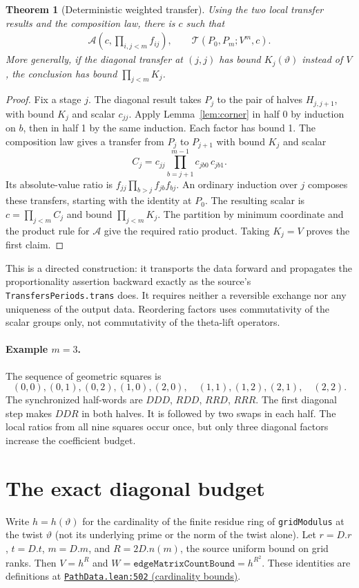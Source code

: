 \documentclass[11pt]{article}
\newtheorem{theorem}{Theorem}[section]
\newcommand{\code}[1]{\texttt{#1}}
\newcommand{\base}{https://github.com/VladimirReshetnikov/ProveIt/blob/835c3695d07c0f77060c5cc63f92eeb52a7d21c2/Analysis/GeneralizedRiemannHypothesis}
\newcommand{\auxlink}[3]{\href{\base/Lean/grh/src/New/Determinant/AuxiliaryForms/#1.lean\#L#2}{\texttt{#1.lean:#2} (#3)}}
\newcommand{\Tr}{\mathcal T}
\newcommand{\absup}{\mathcal A}
\begin{document}
\begin{theorem}[Deterministic weighted transfer]\label{thm:sweep}
Using the two local transfer results and the composition law, there is $c$ such that
\begin{align*}
\absup\!\left(c,\prod_{i,j<m}f_{ij}\right),\qquad
\Tr(P_0,P_m; V^m,c).
\end{align*}
More generally, if the diagonal transfer at $(j,j)$ has bound $K_j(\vartheta)$ instead of $V$, the conclusion has bound $\prod_{j<m}K_j$.
\end{theorem}
\begin{proof}
Fix a stage $j$. The diagonal result takes $P_j$ to the pair of halves $H_{j,j+1}$, with bound $K_j$ and scalar $c_{jj}$. Apply Lemma~\ref{lem:corner} in half 0 by induction on $b$, then in half 1 by the same induction. Each factor has bound 1. The composition law gives a transfer from $P_j$ to $P_{j+1}$ with bound $K_j$ and scalar
\[
C_j=c_{jj}\prod_{b=j+1}^{m-1} c_{jb0}\,c_{jb1}.
\]
Its absolute-value ratio is $f_{jj}\prod_{b>j} f_{jb} f_{bj}$. An ordinary induction over $j$ composes these transfers, starting with the identity at $P_0$. The resulting scalar is $c=\prod_{j<m}C_j$ and bound $\prod_{j<m}K_j$. The partition by minimum coordinate and the product rule for $\absup$ give the required ratio product. Taking $K_j=V$ proves the first claim.
\end{proof}

This is a directed construction: it transports the data forward and propagates the proportionality assertion backward exactly as the source's \code{TransfersPeriods.trans} does. It requires neither a reversible exchange nor any uniqueness of the output data. Reordering factors uses commutativity of the scalar groups only, not commutativity of the theta-lift operators.

\paragraph{Example $m=3$.} The sequence of geometric squares is
\[
(0,0),(0,1),(0,2),(1,0),(2,0),\quad
(1,1),(1,2),(2,1),\quad(2,2).
\]
The synchronized half-words are $DDD$, $RDD$, $RRD$, $RRR$. The first diagonal step makes $DDR$ in both halves. It is followed by two swaps in each half. The local ratios from all nine squares occur once, but only three diagonal factors increase the coefficient budget.

\section{The exact diagonal budget}\label{sec:exact}
Write $h=h(\vartheta)$ for the cardinality of the finite residue ring of \code{gridModulus} at the twist $\vartheta$ (not its underlying prime or the norm of the twist alone). Let $r=D.r$, $t=D.t$, $m=D.m$, and $R=2D.n(m)$, the source uniform bound on grid ranks. Then $V=h^R$ and $W=\code{edgeMatrixCountBound}=h^{R^2}$. These identities are definitions at \auxlink{PathData}{502}{cardinality bounds}.
\end{document}
